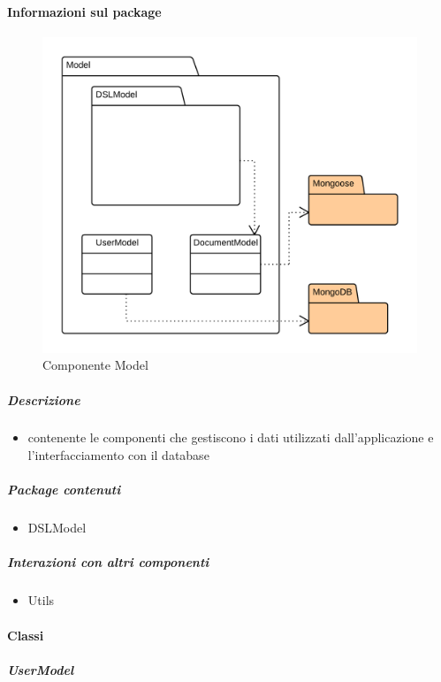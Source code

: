  \paragraph{Informazioni sul package} 
    \begin{figure}[H] 
      \begin{center} 
        \includegraphics[width=\textwidth]{uml/package/Back-end::Lib::Model.png}  
        \caption{Componente Model}
      \end{center}  
    \end{figure} 
  \subparagraph{Descrizione} 
    \begin{itemize}
    \item[]  contenente le componenti che gestiscono i dati utilizzati dall’applicazione e l’interfacciamento con il
database
    \end{itemize} 
    \subparagraph{Package contenuti} 
    \begin{itemize}
        \item DSLModel
    \end{itemize}
  \subparagraph{Interazioni con altri componenti} 
    \begin{itemize} 
        \item Utils  
    \end{itemize} 
    \paragraph{Classi}
      \subparagraph{UserModel}
        
